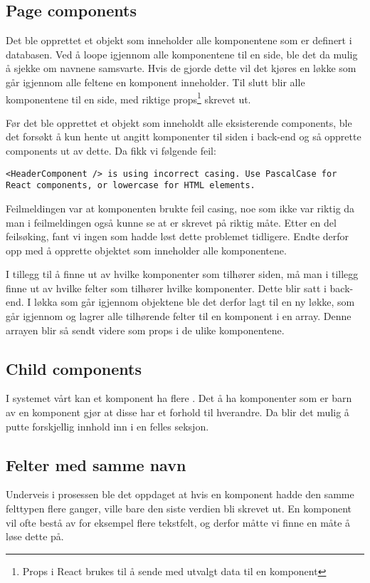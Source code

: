 \subsection{Page components}

Det ble opprettet et objekt som inneholder alle komponentene som er definert i databasen. Ved å loope igjennom alle komponentene til en side, ble det da mulig å sjekke om navnene samsvarte. Hvis de gjorde dette vil det kjøres en løkke som går igjennom alle feltene en komponent inneholder. Til slutt blir alle komponentene til en side, med riktige props\footnote{Props i React brukes til å sende med utvalgt data til en komponent} skrevet ut.  

Før det ble opprettet et objekt som inneholdt alle eksisterende components, ble det forsøkt å kun hente ut angitt komponenter til siden i back-end og så opprette components ut av dette. Da fikk vi følgende feil:
\begin{lstlisting}
<HeaderComponent /> is using incorrect casing. Use PascalCase for React components, or lowercase for HTML elements.
\end{lstlisting}

Feilmeldingen var at komponenten brukte feil casing, noe som ikke var riktig da man i feilmeldingen også kunne se at  er skrevet på riktig måte. Etter en del feilsøking, fant vi ingen som hadde løst dette problemet tidligere. Endte derfor opp med å opprette objektet som inneholder alle komponentene. 

I tillegg til å finne ut av hvilke komponenter som tilhører siden, må man i tillegg finne ut av hvilke felter som tilhører hvilke komponenter. Dette blir satt i back-end. I løkka som går igjennom objektene ble det derfor lagt til en ny løkke, som går igjennom og lagrer alle tilhørende felter til en komponent i en array. Denne arrayen blir så sendt videre som props i de ulike komponentene.

\subsection{Child components}
I systemet vårt kan et komponent ha flere . Det å ha komponenter som er barn av en komponent gjør at disse har et forhold til hverandre. Da blir det mulig å putte forskjellig innhold inn i en felles seksjon.

\subsection{Felter med samme navn}
Underveis i prosessen ble det oppdaget at hvis en komponent hadde den samme felttypen flere ganger, ville bare den siste verdien bli skrevet ut. En komponent vil ofte bestå av for eksempel flere tekstfelt, og derfor måtte vi finne en måte å løse dette på.

